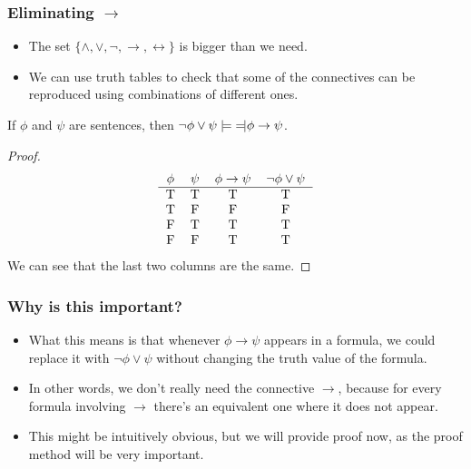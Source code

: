 \documentclass[handout]{beamer}
\newcommand{\lequiv}{\models\text{\reflectbox{$\models$}}}
\newcommand{\ra}{\rightarrow}
\begin{document}
\begin{frame}
\frametitle{Eliminating $\ra$}
\begin{itemize}
\item The set $\{\wedge,\vee,\neg,\rightarrow,\leftrightarrow\}$ is bigger than we need. 
\item We can use truth tables to check that some of the connectives can be reproduced using combinations of different ones.
\end{itemize}
\begin{lemma}\label{L:imp}
If $\phi$ and $\psi$ are sentences, then $\neg\phi \vee \psi \lequiv \phi\rightarrow \psi$.
\end{lemma}
\begin{proof}\mbox{}
\[\begin{tabular}{ c c c c }
 $\phi$ & $\psi$ & $\phi\rightarrow \psi$ & $\neg\phi\vee\psi$ \\ \hline 
 T & T & T & T \\  
 T & F & F & F \\
 F & T & T & T \\
 F & F & T & T   
\end{tabular}\]
\newline
We can see that the last two columns are the same. 
\end{proof}
\end{frame}

\begin{frame}
\frametitle{Why is this important?}
\begin{itemize}
\item What this means is that whenever $\phi\ra \psi$ appears in a formula, we could replace it with $\neg\phi\vee\psi$ without changing the truth value of the formula. 
\vspace{0.5cm}
\item In other words, we don't really need the connective $\ra$, because for every formula involving $\ra$ there's an equivalent one where it does not appear. 
\vspace{0.5cm}
\item This might be intuitively obvious, but we will provide proof now, as the proof method will be very important.
\end{itemize}
\end{frame}
\end{document}
